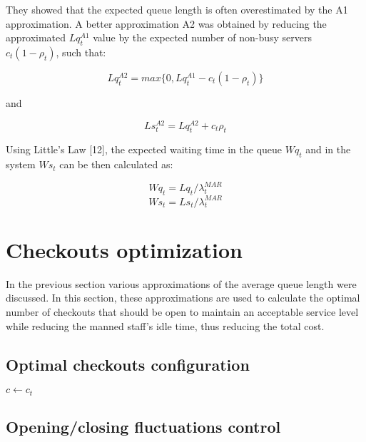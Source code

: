 They showed that the expected queue length is often overestimated by the A1 approximation. A better approximation A2 was obtained by reducing the approximated $ Lq_t^{A1} $ value by the expected number of non-busy servers $ c_t (1 - \rho_t) $, such that:

$$ Lq_t^{A2} = max\{0, Lq_t^{A1} - c_t (1 - \rho_t)\} $$

and

$$ Ls_t^{A2} = Lq_t^{A2} + c_t \rho_t $$

Using Little’s Law [12], the expected waiting time in the queue $ Wq_t $ and in the system $ Ws_t $ can be then calculated as:

$$ Wq_t = Lq_t / \lambda^{MAR}_t $$
$$ Ws_t = Ls_t / \lambda^{MAR}_t $$


\section{Checkouts optimization}
\label{sec:checkouts_optimization}
In the previous section various approximations of the average queue length were discussed. In this section, these approximations are used to calculate the optimal number of checkouts that should be open to maintain an acceptable service level while reducing the manned staff’s idle time, thus reducing the total cost.

\subsection{Optimal checkouts configuration}
\label{subsec:optimal_checkouts_configuration}

\begin{algorithm}[H]
  $ c \gets c_t$\;
\end{algorithm}


\subsection{Opening/closing fluctuations control}
\label{subsec:opening_closing_fluctuations_control}

